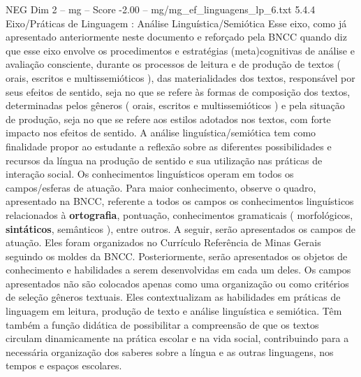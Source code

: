 \begin{textsample}{NEG Dim 2 – mg – Score -2.00 – mg/mg\_ef\_linguagens\_lp\_6.txt}  \label{ex:f2_neg_094}
5.4.4 Eixo/Práticas de Linguagem : Análise Linguística/Semiótica Esse eixo, como já apresentado anteriormente neste documento e reforçado pela BNCC quando diz que esse eixo envolve os procedimentos e estratégias (meta)cognitivas de análise e avaliação consciente, durante os processos de leitura e de produção de textos ( orais, escritos e multissemióticos ), das materialidades dos textos, responsável por seus efeitos de sentido, seja no que se refere às formas de composição dos textos, determinadas pelos gêneros ( orais, escritos e multissemióticos ) e pela situação de produção, seja no que se refere aos estilos adotados nos textos, com forte impacto nos efeitos de sentido.
A análise linguística/semiótica tem como finalidade propor ao estudante a reflexão sobre as diferentes possibilidades e recursos da língua na produção de sentido e sua utilização nas práticas de interação social.
Os conhecimentos linguísticos operam em todos os campos/esferas de atuação.
Para maior conhecimento, observe o quadro, apresentado na BNCC, referente a todos os campos os conhecimentos linguísticos relacionados à \textbf{ortografia}, pontuação, conhecimentos gramaticais ( morfológicos, \textbf{sintáticos}, semânticos ), entre outros.
A seguir, serão apresentados os campos de atuação.
Eles foram organizados no Currículo Referência de Minas Gerais seguindo os moldes da BNCC.
Posteriormente, serão apresentados os objetos de conhecimento e habilidades a serem desenvolvidas em cada um deles.
Os campos apresentados não são colocados apenas como uma organização ou como critérios de seleção gêneros textuais.
Eles contextualizam as habilidades em práticas de linguagem em leitura, produção de texto e análise linguística e semiótica.
Têm também a função didática de possibilitar a compreensão de que os textos circulam dinamicamente na prática escolar e na vida social, contribuindo para a necessária organização dos saberes sobre a língua e as outras linguagens, nos tempos e espaços escolares.

\end{textsample}

